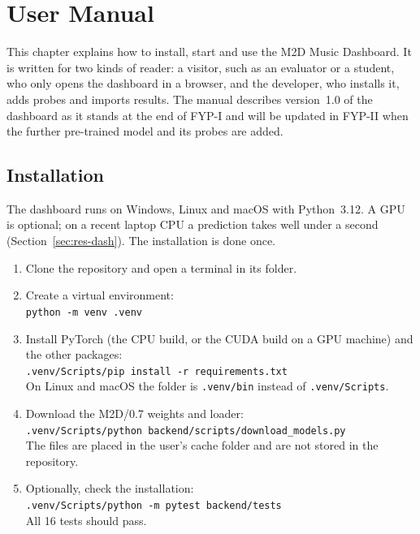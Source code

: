 \chapter{User Manual}
\label{ch:manual}
This chapter explains how to install, start and use the M2D Music Dashboard. It is written for two kinds of reader: a visitor, such as an evaluator or a student, who only opens the dashboard in a browser, and the developer, who installs it, adds probes and imports results. The manual describes version~1.0 of the dashboard as it stands at the end of FYP-I and will be updated in FYP-II when the further pre-trained model and its probes are added.

\section{Installation}
\label{sec:man-install}
The dashboard runs on Windows, Linux and macOS with Python~3.12. A GPU is optional; on a recent laptop CPU a prediction takes well under a second (Section~\ref{sec:res-dash}). The installation is done once.
\begin{enumerate}
  \item Clone the repository and open a terminal in its folder.
  \item Create a virtual environment:\\ \texttt{python -m venv .venv}
  \item Install PyTorch (the CPU build, or the CUDA build on a GPU machine) and the other packages:\\ \texttt{.venv/Scripts/pip install -r requirements.txt}\\ On Linux and macOS the folder is \texttt{.venv/bin} instead of \texttt{.venv/Scripts}.
  \item Download the M2D/0.7 weights and loader:\\ \texttt{.venv/Scripts/python backend/scripts/download\_models.py}\\ The files are placed in the user's cache folder and are not stored in the repository.
  \item Optionally, check the installation:\\ \texttt{.venv/Scripts/python -m pytest backend/tests}\\ All 16 tests should pass.
\end{enumerate}

